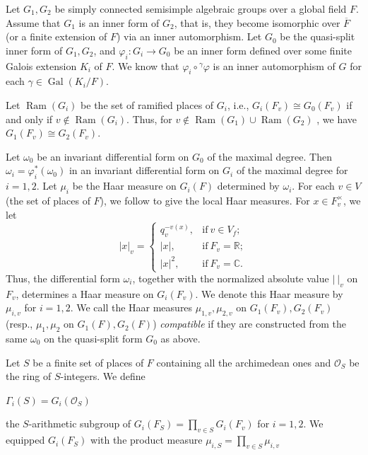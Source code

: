 \documentclass[11pt]{article}
\theoremstyle{plain}
\theoremstyle{remark}
\theoremstyle{definition}
\DeclareMathOperator{\Gal}{Gal}
\DeclareMathOperator{\ram}{Ram}
\begin{document}
Let $G_1,G_2$ be simply connected semisimple algebraic groups over a global field $F$. 
Assume that $G_1$ is an inner form of $G_2$, that is, they become isomorphic over 
$\overline{F}$ (or a finite extension of $F$) via an inner automorphism. 
Let $G_0$ be the quasi-split inner form of $G_1,G_2$, and $\varphi_i\colon G_i\to G_0$ be an inner form defined over some finite Galois extension $K_i$ of $F$. 
We know that $\varphi_i\circ {}^{\gamma}\varphi$ is an inner automorphism of $G$ for each $\gamma\in \Gal(K_i/F)$. 

Let $\ram(G_i)$ be the set of ramified places of $G_i$, i.e., $G_i(F_v)\cong G_0(F_v)$ if and only if $v\notin \ram(G_i)$. 
Thus, for $v\notin \ram(G_1)\cup \ram(G_2)$ , we have $G_{1}(F_v)\cong G_{2}(F_v)$. 


Let $\omega_0$ be an invariant differential form on $G_0$ of the maximal degree. 
Then $\omega_i=\varphi_{i}^{*}(\omega_0)$ in an invariant differential form on $G_i$ of the maximal degree for $i=1,2$. 
Let $\mu_i$ be the Haar measure on $G_i(F)$ determined by $\omega_i$. 
For each $v\in V$ (the set of places of $F$),
we follow \cite[\S 2.1]{Prasad89} to give the local Haar measures. 
For $x\in F_v^{\times}$, we let
\begin{equation*}
    |x|_v=
    \begin{cases}
      q_v^{-v(x)}, & \text{if}\ v\in V_f; \\
      |x|, & \text{if}\ F_v=\mathbb{R};\\
      |x|^2, & \text{if}\ F_v=\mathbb{C}.
    \end{cases}
  \end{equation*}
Thus, the differential form $\omega_i$, together with the normalized absolute value $|~|_v$ on $F_v$, determines a Haar measure on $G_i(F_v)$. 
We denote this Haar measure by $\mu_{i,v}$ for $i=1,2$. 
We call the Haar measures  $\mu_{1,v},\mu_{2,v}$ on $G_{1}(F_v),G_{2}(F_v)$ (resp., $\mu_1,\mu_2$ on $G_{1}(F),G_{2}(F)$) {\it compatible} if they are constructed from the same $\omega_0$ on the quasi-split form $G_0$ as above. 

Let $S$ be a finite set of places of $F$ containing all the archimedean ones and $\mathcal{O}_S$ be the ring of $S$-integers. 
We define
\begin{center}
    $\Gamma_i(S)=G_i(\mathcal{O}_S)$
\end{center}
the $S$-arithmetic subgroup of $G_i(F_S)=\prod_{v\in S}G_i(F_v)$ for $i=1,2$. 
We equipped $G_i(F_S)$ with the product measure $\mu_{i,S}=\prod_{v\in S}\mu_{i,v}$
\end{document}
